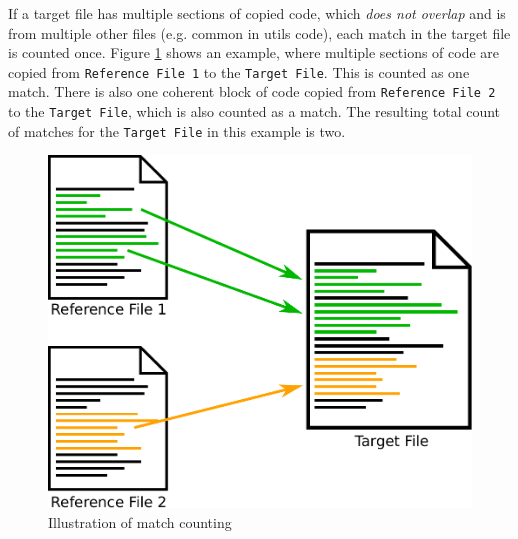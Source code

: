 If a target file has multiple sections of copied code, which \textit{does not overlap} and is from multiple other files (e.g. common in utils code), each match in the target file is counted once.
Figure \ref{fig:match_counting} shows an example, where multiple sections of code are copied from \texttt{Reference File 1} to the \texttt{Target File}.
This is counted as one match.
There is also one coherent block of code copied from \texttt{Reference File 2} to the \texttt{Target File}, which is also counted as a match.
The resulting total count of matches for the \texttt{Target File} in this example is two.

\begin{figure}
	\centering
	\includegraphics[width=0.8\linewidth]{figures/match_counting.pdf}
	\caption{Illustration of match counting}\label{fig:match_counting}
\end{figure}

